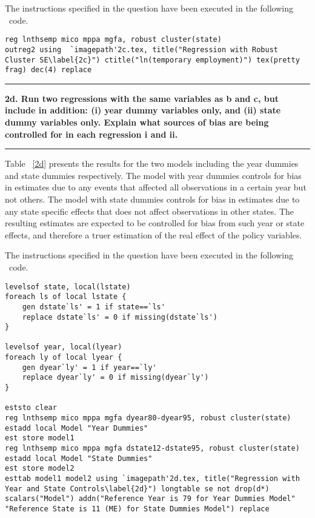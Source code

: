 \documentclass[12pt]{article}
\newcommand\question[1]{\vspace{1em}\hrule\vspace{1em}\textbf{#1}\vspace{1em}\hrule\vspace{1em}}
\begin{document}
The instructions specified in the question have been executed in the following \stata \  code.\\
\begin{lstlisting}
reg lnthsemp mico mppa mgfa, robust cluster(state)
outreg2 using  `imagepath'2c.tex, title("Regression with Robust Cluster SE\label{2c}") ctitle("ln(temporary employment)") tex(pretty frag) dec(4) replace
\end{lstlisting}

\newpage
\question{2d. Run two regressions with the same variables as b and c, but include in addition: (i) year dummy variables only, and (ii) state dummy variables only. Explain what sources of bias are being controlled for in each regression i and ii.}

\noindent Table ~\ref{2d} presents the results for the two models including the year dummies and state dummies respectively. The model with year dummies controls for bias in estimates due to any events that affected all observations in a certain year but not others. The model with state dummies controls for bias in estimates due to any state specific effects that does not affect observations in other states. The resulting estimates are expected to be controlled for bias from such year or state effects, and therefore a truer estimation of the real effect of the policy variables.




The instructions specified in the question have been executed in the following \stata \  code.\\
\begin{lstlisting}
levelsof state, local(lstate)
foreach ls of local lstate {
	gen dstate`ls' = 1 if state==`ls'
	replace dstate`ls' = 0 if missing(dstate`ls')
}

levelsof year, local(lyear)
foreach ly of local lyear {
	gen dyear`ly' = 1 if year==`ly'
	replace dyear`ly' = 0 if missing(dyear`ly')
}

eststo clear
reg lnthsemp mico mppa mgfa dyear80-dyear95, robust cluster(state)
estadd local Model "Year Dummies"
est store model1
reg lnthsemp mico mppa mgfa dstate12-dstate95, robust cluster(state)
estadd local Model "State Dummies"
est store model2
esttab model1 model2 using `imagepath'2d.tex, title("Regression with Year and State Controls\label{2d}") longtable se not drop(d*) scalars("Model") addn("Reference Year is 79 for Year Dummies Model" "Reference State is 11 (ME) for State Dummies Model") replace
\end{lstlisting}
\end{document}
